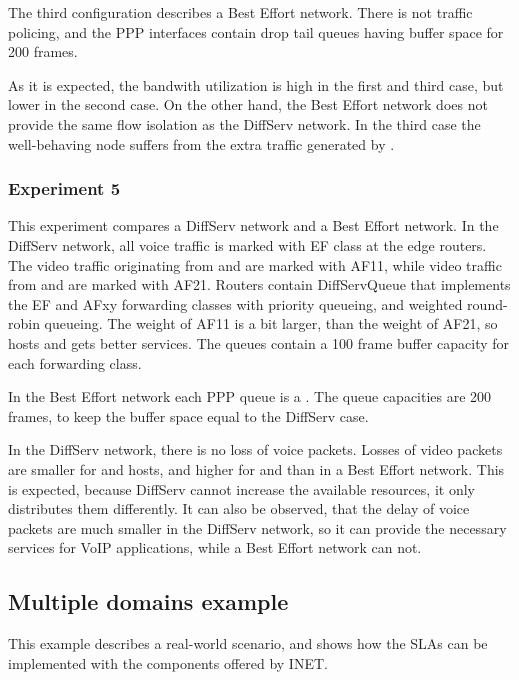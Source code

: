 The third configuration describes a Best Effort network.
There is not traffic policing, and the PPP interfaces contain
drop tail queues having buffer space for 200 frames.

As it is expected, the bandwith utilization is high in the first
and third case, but lower in the second case. On the other hand,
the Best Effort network does not provide the same flow isolation
as the DiffServ network. In the third case the well-behaving
 node suffers from the extra traffic generated by .

\subsubsection*{Experiment 5}

This experiment compares a DiffServ network and a Best Effort network.
In the DiffServ network, all voice traffic is marked with EF class
at the edge routers. The video traffic originating from  and
 are marked with AF11, while video traffic from  and
 are marked with AF21. Routers contain DiffServQueue that
implements the EF and AFxy forwarding classes with priority queueing,
and weighted round-robin queueing. The weight of AF11 is a bit larger,
than the weight of AF21, so hosts  and  gets better
services. The queues contain a 100 frame buffer capacity for each forwarding
class.

In the Best Effort network each PPP queue is a .
The queue capacities are 200 frames, to keep the buffer space equal to
the DiffServ case.

In the DiffServ network, there is no loss of voice packets. Losses
of video packets are smaller for  and  hosts, and
higher for  and  than in a Best Effort network.
This is expected, because DiffServ cannot increase the available
resources, it only distributes them differently. It can also be
observed, that the delay of voice packets are much smaller in the
DiffServ network, so it can provide the necessary services for
VoIP applications, while a Best Effort network can not.

\subsection*{Multiple domains example}

This example describes a real-world scenario, and shows how
the SLAs can be implemented with the components offered by INET.



